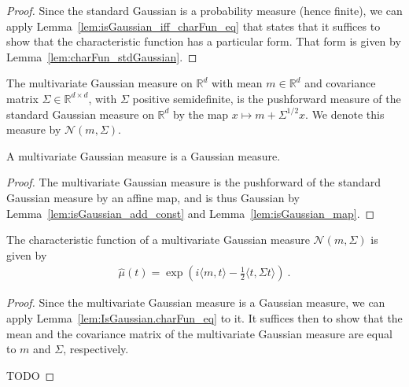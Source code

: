 \begin{proof}
Since the standard Gaussian is a probability measure (hence finite), we can apply Lemma~\ref{lem:isGaussian_iff_charFun_eq} that states that it suffices to show that the characteristic function has a particular form.
That form is given by Lemma~\ref{lem:charFun_stdGaussian}.
\end{proof}


\begin{definition}\label{def:multivariateGaussian}
  \leanok
The multivariate Gaussian measure on $\mathbb{R}^d$ with mean $m \in \mathbb{R}^d$ and covariance matrix $\Sigma \in \mathbb{R}^{d \times d}$, with $\Sigma$ positive semidefinite, is the pushforward measure of the standard Gaussian measure on $\mathbb{R}^d$ by the map $x \mapsto m + \Sigma^{1/2} x$.
We denote this measure by $\mathcal{N}(m, \Sigma)$.
\end{definition}


\begin{lemma}\label{lem:isGaussian_multivariateGaussian}
A multivariate Gaussian measure is a Gaussian measure.
\end{lemma}

\begin{proof}
The multivariate Gaussian measure is the pushforward of the standard Gaussian measure by an affine map, and is thus Gaussian by Lemma~\ref{lem:isGaussian_add_const} and Lemma~\ref{lem:isGaussian_map}.
\end{proof}


\begin{theorem}\label{thm:charFun_multivariateGaussian}
The characteristic function of a multivariate Gaussian measure $\mathcal{N}(m, \Sigma)$ is given by
\begin{align*}
  \hat{\mu}(t) = \exp\left(i \langle m, t \rangle - \frac{1}{2} \langle t, \Sigma t \rangle\right)
  \: .
\end{align*}
\end{theorem}

\begin{proof}
Since the multivariate Gaussian measure is a Gaussian measure, we can apply Lemma~\ref{lem:IsGaussian.charFun_eq} to it.
It suffices then to show that the mean and the covariance matrix of the multivariate Gaussian measure are equal to $m$ and $\Sigma$, respectively.

TODO
\end{proof}



